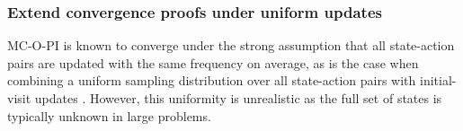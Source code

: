 





\subsubsection{Extend convergence proofs under uniform updates}



MC-O-PI is known to converge under the strong assumption that all state-action pairs are updated with the same frequency on average,
as is the case when combining a uniform sampling distribution over all state-action pairs with initial-visit updates \citep{Tsitsiklis2002OnIteration, Chen2018OnProblem, Liu2021OnStarts}.
However, this uniformity is unrealistic as the full set of states is typically unknown in large problems.


